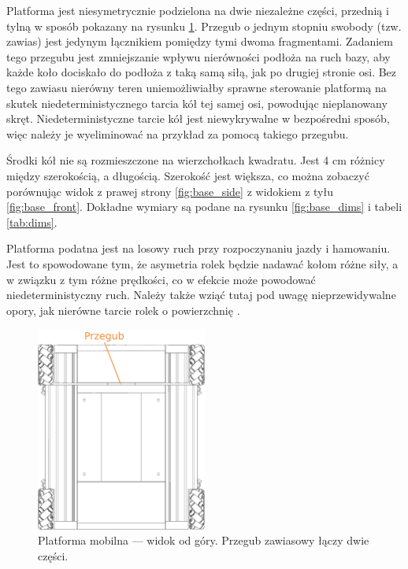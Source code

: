 Platforma jest niesymetrycznie podzielona na dwie niezależne części, przednią i tylną w sposób pokazany na rysunku \ref{fig:base_top}.
Przegub o jednym stopniu swobody (tzw. zawias) jest jedynym łącznikiem pomiędzy tymi dwoma fragmentami.
Zadaniem tego przegubu jest zmniejszanie wpływu nierówności podłoża na ruch bazy, aby każde koło dociskało do podłoża z taką samą siłą, jak po drugiej stronie osi.
Bez tego zawiasu nierówny teren uniemożliwiałby sprawne sterowanie platformą na skutek niedeterministycznego tarcia kół tej samej osi, powodując nieplanowany skręt.
Niedeterministyczne tarcie kół jest niewykrywalne w bezpośredni sposób, więc należy je wyeliminować na przykład za pomocą takiego przegubu.

Środki kół nie są rozmieszczone na wierzchołkach kwadratu. Jest 4 cm różnicy między szerokością, a długością.
Szerokość jest większa, co można zobaczyć porównując widok z prawej strony \ref{fig:base_side} z widokiem z tyłu \ref{fig:base_front}.
Dokładne wymiary są podane na rysunku \ref{fig:base_dims} i tabeli \ref{tab:dims}.

Platforma podatna jest na losowy ruch przy rozpoczynaniu jazdy i hamowaniu.
Jest to spowodowane tym, że asymetria rolek będzie nadawać kołom różne siły, a w związku z tym różne prędkości, co w efekcie może powodować niedeterministyczny ruch.
Należy także wziąć tutaj pod uwagę nieprzewidywalne opory, jak nierówne tarcie rolek o powierzchnię \cite{braking}.

\begin{figure}[H]
\centering
 \includegraphics[width=0.5\textwidth]{graphics/base_top.png}
\caption{Platforma mobilna --- widok od góry. Przegub zawiasowy łączy dwie części.}
\label{fig:base_top}
\end{figure} 

